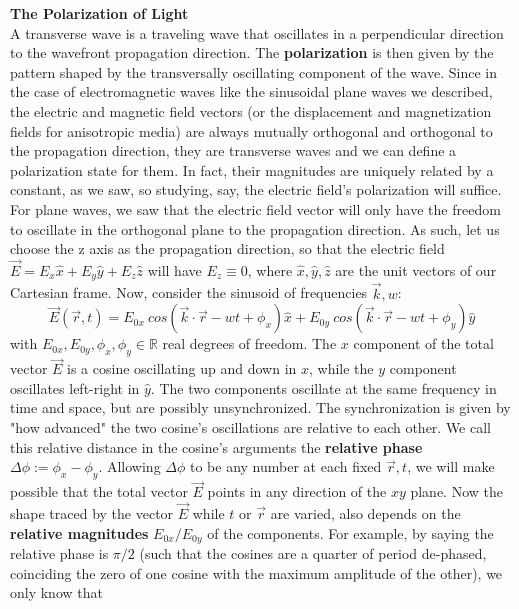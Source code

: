\documentclass[11pt, a4paper, twoside]{article} %
\newcommand{\R}{\mathbb{R}} %
\DeclareRobustCommand{\mybox}[2][gray!10]{%
\begin{tcolorbox}[   %
        left=0.2cm,
        right=0.2cm,
        top=0.15cm,
        bottom=0.15cm,
        colback=#1,
        colframe=#1,
        width=\dimexpr\textwidth\relax, 
        enlarge left by=0mm,
        boxsep=5pt,
        arc=0pt,outer arc=0pt,
        ]
        #2
\end{tcolorbox}
}
\begin{document}
\mybox{{\bf The Polarization of Light \vspace{0.2cm}}\\
A transverse wave is a traveling wave that oscillates in a perpendicular direction to the wavefront propagation direction. The {\bf polarization} is then given by the pattern shaped by the transversally oscillating component of the wave. Since in the case of electromagnetic waves like the sinusoidal plane waves we described, the electric and magnetic field vectors (or the displacement and magnetization fields for anisotropic media) are always mutually orthogonal and orthogonal to the propagation direction, they are transverse waves and we can define a polarization state for them. In fact, their magnitudes are uniquely related by a constant, as we saw, so studying, say, the electric field's polarization will suffice. \\

For plane waves, we saw that the electric field vector will only have the freedom to oscillate in the orthogonal plane to the propagation direction. As such, let us choose the z axis as the propagation direction, so that the electric field $\vec{E}=E_x\hat{x}+E_y\hat{y}+E_z\hat{z}$ will have $E_z\equiv  0$, where $\hat{x},\hat{y},\hat{z}$ are the unit vectors of our Cartesian frame. Now, consider the sinusoid of frequencies $\vec{k},w$:
\begin{equation}
\vec{E}(\vec{r},t)=E_{0x}\ cos(\vec{k}\cdot\vec{r}-wt+\phi_x)\hat{x}+ E_{0y}\ cos(\vec{k}\cdot\vec{r}-wt+\phi_y)\hat{y}
\end{equation} 
with $E_{0x},E_{0y},\phi_x,\phi_y\in\R$ real degrees of freedom. The $x$ component of the total vector $\vec{E}$ is a cosine oscillating up and down in $\hat{x}$, while the $y$ component oscillates left-right in $\hat{y}$. The two components oscillate at the same frequency in time and space, but are possibly unsynchronized. The synchronization is given by "how advanced" the two cosine's oscillations are relative to each other. We call this relative distance in the cosine's arguments the {\bf relative phase} $\Delta \phi:=\phi_x-\phi_y$. Allowing $\Delta \phi$ to be any number at each fixed $\vec{r},t$, we will make possible that the total vector $\vec{E}$ points in any direction of the $xy$ plane. Now the shape traced by the vector $\vec{E}$ while $t$ or $\vec{r}$ are varied, also depends on the {\bf relative magnitudes} $E_{0x}/E_{0y}$ of the components. For example, by saying the relative phase is $\pi/2$ (such that the cosines are a quarter of period de-phased, coinciding the zero of one cosine with the maximum amplitude of the other), we only know that}
\end{document}
